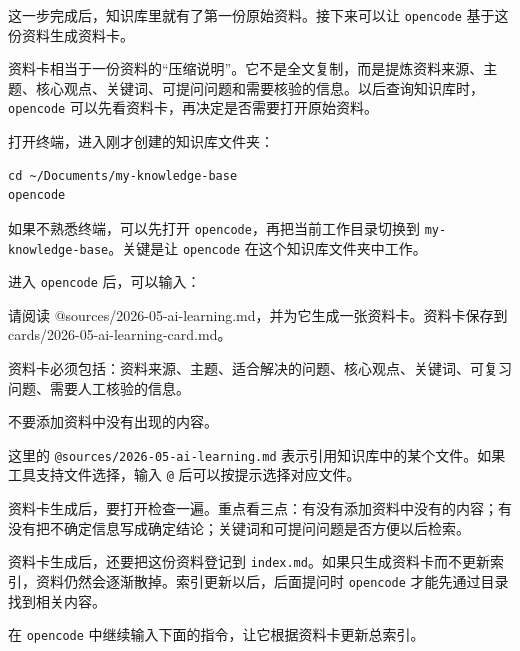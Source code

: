 这一步完成后，知识库里就有了第一份原始资料。接下来可以让 \texttt{opencode} 基于这份资料生成资料卡。


资料卡相当于一份资料的“压缩说明”。它不是全文复制，而是提炼资料来源、主题、核心观点、关键词、可提问问题和需要核验的信息。以后查询知识库时，\texttt{opencode} 可以先看资料卡，再决定是否需要打开原始资料。

\begin{tcolorbox}[stepbox,title=操作 5：进入知识库并启动 opencode]
打开终端，进入刚才创建的知识库文件夹：

\begin{verbatim}
cd ~/Documents/my-knowledge-base
opencode
\end{verbatim}

如果不熟悉终端，可以先打开 \texttt{opencode}，再把当前工作目录切换到 \texttt{my-knowledge-base}。关键是让 \texttt{opencode} 在这个知识库文件夹中工作。
\end{tcolorbox}

进入 \texttt{opencode} 后，可以输入：

\begin{tcolorbox}[filebox,title=提示词或示例内容]
请阅读 @sources/2026-05-ai-learning.md，并为它生成一张资料卡。资料卡保存到 cards/2026-05-ai-learning-card.md。

资料卡必须包括：资料来源、主题、适合解决的问题、核心观点、关键词、可复习问题、需要人工核验的信息。

不要添加资料中没有出现的内容。
\end{tcolorbox}

这里的 \texttt{@sources/2026-05-ai-learning.md} 表示引用知识库中的某个文件。如果工具支持文件选择，输入 \texttt{@} 后可以按提示选择对应文件。

资料卡生成后，要打开检查一遍。重点看三点：有没有添加资料中没有的内容；有没有把不确定信息写成确定结论；关键词和可提问问题是否方便以后检索。


资料卡生成后，还要把这份资料登记到 \texttt{index.md}。如果只生成资料卡而不更新索引，资料仍然会逐渐散掉。索引更新以后，后面提问时 \texttt{opencode} 才能先通过目录找到相关内容。

\begin{tcolorbox}[stepbox,title=操作 6：更新知识库索引]
在 \texttt{opencode} 中继续输入下面的指令，让它根据资料卡更新总索引。
\end{tcolorbox}

